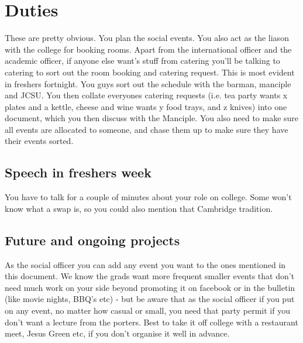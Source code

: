 \documentclass[9.5pt]{article} %
\begin{document}

\tableofcontents %

\newpage 


\section{Duties}
These are pretty obvious. You plan the social events. You also act as the liason with the college for booking rooms. Apart from the international officer and the academic officer, if anyone else want's stuff from catering you'll be talking to catering to sort out the room booking and catering request. This is most evident in freshers fortnight. You guys sort out the schedule with the barman, manciple and JCSU. You then collate everyones catering requests (i.e. tea party wants x plates and a kettle, cheese and wine wants y food trays, and z knives) into one document, which you then discuss with the Manciple.
You also need to make sure all events are allocated to someone, and chase them up to make sure they have their events sorted.

\subsection{Speech in freshers week} %
You have to talk for a couple of minutes about your role on college. Some won't know what a swap is, so you could also mention that Cambridge tradition.
\subsection{Future and ongoing projects} %
As the social officer you can add any event you want to the ones mentioned in this document. We know the grads want more frequent smaller events that don't need much work on your side beyond promoting it on facebook or in the bulletin (like movie nights, BBQ's etc) - but be aware that as the social officer if you put on any event, no matter how casual or small, you need that party permit if you don't want a lecture from the porters. Best to take it off college with a restaurant meet, Jesus Green etc, if you don't organise it well in advance.
\end{document}
